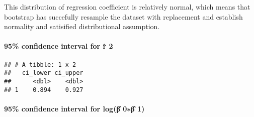\documentclass[]{article}
\newenvironment{Shaded}{\begin{snugshade}}{\end{snugshade}}
\newcommand{\DataTypeTok}[1]{\textcolor[rgb]{0.13,0.29,0.53}{#1}}
\newcommand{\FloatTok}[1]{\textcolor[rgb]{0.00,0.00,0.81}{#1}}
\newcommand{\KeywordTok}[1]{\textcolor[rgb]{0.13,0.29,0.53}{\textbf{#1}}}
\newcommand{\NormalTok}[1]{#1}
\newcommand{\OperatorTok}[1]{\textcolor[rgb]{0.81,0.36,0.00}{\textbf{#1}}}
\newcommand{\StringTok}[1]{\textcolor[rgb]{0.31,0.60,0.02}{#1}}
\let\oldparagraph\paragraph
\renewcommand{\paragraph}[1]{\oldparagraph{#1}\mbox{}}
\begin{document}
This distribution of regression coefficient is relatively normal, which
means that bootstrap has succefully resample the dataset with
replacement and establish normality and satisified distributional
assumption.

\hypertarget{confidence-interval-for-r-2}{%
\paragraph{95\% confidence interval for r̂
2}\label{confidence-interval-for-r-2}}

\begin{Shaded}
\end{Shaded}

\begin{verbatim}
## # A tibble: 1 x 2
##   ci_lower ci_upper
##      <dbl>    <dbl>
## 1    0.894    0.927
\end{verbatim}

\hypertarget{confidence-interval-for-logux3b2-0ux3b2-1}{%
\paragraph{95\% confidence interval for log(β̂ 0∗β̂
1)}\label{confidence-interval-for-logux3b2-0ux3b2-1}}
\end{document}

